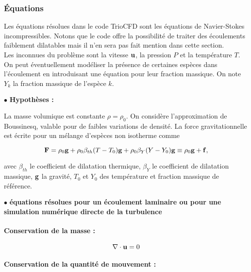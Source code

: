  

\subsubsection{\'Equations}

Les \'equations r\'esolues dans le code TrioCFD sont les \'equations de Navier-Stokes incompressibles. Notons que le code offre la possibilit\'e de traiter des \'ecoulements faiblement dilatables mais il n'en sera pas fait mention dans cette section.\\
Les inconnues du probl\`eme sont la vitesse $\mbf u$, la pression $P$ et la temp\'erature $T$. On peut \'eventuellement mod\'eliser la pr\'esence de certaines esp\`eces dans l'\'ecoulement en introduisant une \'equation pour leur fraction massique. On note $Y_k$ la fraction massique de l'esp\`ece $k$.

$ \bullet $ {\bf{Hypoth\`eses :}}

 La masse volumique est constante $\rho = \rho _0$. On consid\`ere l'approximation de Boussinesq, valable pour de faibles variations de densit\'e. La force gravitationnelle est \'ecrite pour un m\'elange d'esp\`eces non isotherme  comme
 
\begin{equation}
 \ds{
 {\mbf{F}} = \rho _0\mbf g +\rho _0 \beta _{th}(T-T_0)\mbf g + \rho _0 \beta _Y (Y- Y_0)\mbf g \equiv \rho _0\mbf g + 
 {\mbf{f},}}
\end{equation}

avec $\beta _{th}$ le coefficient de dilatation thermique, $\beta _Y$ le coefficient de dilatation massique, $\mbf g$ la gravit\'e, $T_0$ et $Y_0$ des temp\'erature et fraction massique de r\'ef\'erence.

$ \bullet $ {\bf{\'equations r\'esolues pour un \'ecoulement laminaire ou pour une simulation num\'erique directe de la turbulence}}

\paragraph{Conservation de la masse :}


\begin{equation}
\label{NS-masse}
\ds{\nabla\cdot\mathbf{u}=0}
\end{equation}

\paragraph{Conservation de la quantit\'e de mouvement :}

